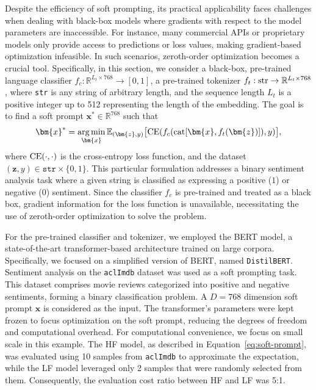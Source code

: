 \documentclass[10pt]{article} %
\numberwithin{equation}{section}
\theoremstyle{plain}
\theoremstyle{definition}
\newcommand{\<}{\langle}
\renewcommand{\>}{\rangle}
\renewcommand{\(}{\left(}
\renewcommand{\)}{\right)}
\renewcommand{\[}{\left[}
\renewcommand{\]}{\right]}
\DeclareMathOperator*{\argmin}{arg\,min}
\begin{document}
Despite the efficiency of soft prompting, its practical applicability faces challenges when dealing with black-box models where gradients with respect to the model parameters are inaccessible. For instance, many commercial APIs or proprietary models only provide access to predictions or loss values, making gradient-based optimization infeasible. In such scenarios, zeroth-order optimization becomes a crucial tool. Specifically, in this section, we consider a black-box, pre-trained language classifier $f_c:\mathbb{R}^{L_t \times 768} \to [0, 1]$, a pre-trained tokenizer $f_t:\textup{str} \to \mathbb{R}^{L_t \times 768}$, where \texttt{str} is any string of arbitrary length, and the sequence length $L_t$ is a positive integer up to 512 representing the length of the embedding. The goal  is to find a soft prompt $\bm{x}^\ast \in \mathbb{R}^{768}$ such that
\begin{equation}
\label{eq:soft-prompt}
\bm{x}^\ast = \argmin_{\bm{x}} \mathbb{E}_{(\bm{z}, y)}\big[\textup{CE}(f_c(\textup{cat}[\bm{x}, f_t(\bm{z})]), y)\big],
\end{equation}
where $\textup{CE}(\cdot,\cdot)$ is the cross-entropy loss function, and the dataset $(\bm{z}, y) \in \texttt{str} \times \{0, 1\}$. This particular formulation addresses a binary sentiment analysis task where a given string is classified as expressing a positive ($1$) or negative ($0$) sentiment. Since the classifier $f_c$ is pre-trained and treated as a black box, gradient information for the loss function is unavailable, necessitating the use of zeroth-order optimization to solve the problem.

For the pre-trained classifier and tokenizer, we employed the BERT model, a state-of-the-art transformer-based architecture trained on large corpora. Specifically, we focused on a simplified version of BERT, named \texttt{DistilBERT}. Sentiment analysis on the \texttt{aclImdb} dataset was used as a soft prompting task. This dataset comprises movie reviews categorized into positive and negative sentiments, forming a binary classification problem. A $D=768$ dimension soft prompt $\bm x$ is considered as the input. The transformer's parameters were kept frozen to focus optimization on the soft prompt, reducing the degrees of freedom and computational overhead. For computational convenience, we focus on small scale in this example.
The HF model, as described in Equation~\eqref{eq:soft-prompt}, was evaluated using 10 samples from \texttt{aclImdb} to approximate the expectation, while the LF model leveraged only 2 samples that were randomly selected from them. Consequently, the evaluation cost ratio between HF and LF was 5:1.
\end{document}
